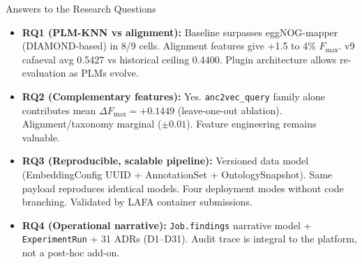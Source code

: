\documentclass[12pt, aspectratio=169]{beamer}
\newcommand{\fmax}{$F_{\max}$}
\begin{document}
\begin{frame}{Answers to the Research Questions}
  \begin{itemize}
    \item \textbf{RQ1 (PLM-KNN vs alignment):} Baseline surpasses eggNOG-mapper
          (DIAMOND-based) in 8/9 cells. Alignment features give +1.5 to 4\% \fmax.
          v9 cafaeval avg 0.5427 vs historical ceiling 0.4400.
          Plugin architecture allows re-evaluation as PLMs evolve.

    \item \textbf{RQ2 (Complementary features):} Yes. \texttt{anc2vec\_query}
          family alone contributes mean $\Delta F_{\max} = +0.1449$ (leave-one-out ablation).
          Alignment/taxonomy marginal ($\pm 0.01$). Feature engineering remains valuable.

    \item \textbf{RQ3 (Reproducible, scalable pipeline):} Versioned data model
          (EmbeddingConfig UUID + AnnotationSet + OntologySnapshot). Same payload reproduces
          identical models. Four deployment modes without code branching.
          Validated by LAFA container submissions.

    \item \textbf{RQ4 (Operational narrative):} \texttt{Job.findings} narrative
          model + \texttt{ExperimentRun} + 31 ADRs (D1--D31). Audit trace is integral
          to the platform, not a post-hoc add-on.
  \end{itemize}
\end{frame}
\end{document}
